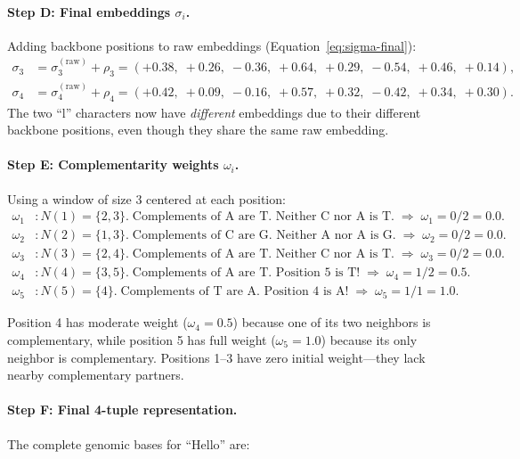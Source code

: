 \paragraph{Step D: Final embeddings $\sigma_i$.} Adding backbone positions to raw embeddings (Equation~\ref{eq:sigma-final}):
\begin{align*}
\sigma_3 &= \sigma_3^{(\text{raw})} + \rho_3 = (+0.38,\; +0.26,\; -0.36,\; +0.64,\; +0.29,\; -0.54,\; +0.46,\; +0.14), \\
\sigma_4 &= \sigma_4^{(\text{raw})} + \rho_4 = (+0.42,\; +0.09,\; -0.16,\; +0.57,\; +0.32,\; -0.42,\; +0.34,\; +0.30).
\end{align*}
The two ``l'' characters now have \emph{different} embeddings due to their different backbone positions, even though they share the same raw embedding.

\paragraph{Step E: Complementarity weights $\omega_i$.} Using a window of size 3 centered at each position:
\begin{align*}
\omega_1 &: N(1) = \{2, 3\}. \;\text{Complements of A are T. Neither C nor A is T.} \;\Rightarrow\; \omega_1 = 0/2 = 0.0. \\
\omega_2 &: N(2) = \{1, 3\}. \;\text{Complements of C are G. Neither A nor A is G.} \;\Rightarrow\; \omega_2 = 0/2 = 0.0. \\
\omega_3 &: N(3) = \{2, 4\}. \;\text{Complements of A are T. Neither C nor A is T.} \;\Rightarrow\; \omega_3 = 0/2 = 0.0. \\
\omega_4 &: N(4) = \{3, 5\}. \;\text{Complements of A are T. Position 5 is T!} \;\Rightarrow\; \omega_4 = 1/2 = 0.5. \\
\omega_5 &: N(5) = \{4\}. \;\text{Complements of T are A. Position 4 is A!} \;\Rightarrow\; \omega_5 = 1/1 = 1.0.
\end{align*}

Position 4 has moderate weight ($\omega_4 = 0.5$) because one of its two neighbors is complementary, while position 5 has full weight ($\omega_5 = 1.0$) because its only neighbor is complementary. Positions 1--3 have zero initial weight---they lack nearby complementary partners.

\paragraph{Step F: Final 4-tuple representation.} The complete genomic bases for ``Hello'' are:

